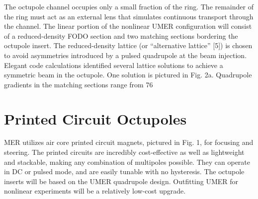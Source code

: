 The octupole channel occupies only a small fraction of the ring. The remainder of the ring must act as an external lens that simulates continuous transport through the channel. The linear portion of the nonlinear UMER configuration will consist of a reduced-density FODO section and two matching sections bordering the octupole insert. The reduced-density lattice (or “alternative lattice” [5]) is chosen to avoid asymmetries introduced by a pulsed quadrupole at the beam injection. Elegant code calculations identified several lattice solutions to achieve a symmetric beam in the octupole. One solution is pictured in Fig. 2a.  Quadrupole gradients in the matching sections range from 76%

\section{Printed Circuit Octupoles}





MER utilizes air core printed circuit magnets, pictured in Fig. 1, for focusing and steering. The printed circuits are incredibly cost-effective as well as lightweight and stackable, making any combination of multipoles possible. They can operate in DC or pulsed mode, and are easily tunable with no hysteresis. 
The octupole inserts will be based on the UMER quadrupole design. Outfitting UMER for nonlinear experiments will be a relatively low-cost upgrade.

